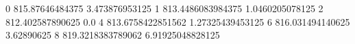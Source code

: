 0 815.87646484375 3.473876953125
1 813.4486083984375 1.0460205078125
2 812.402587890625 0.0
4 813.6758422851562 1.27325439453125
6 816.031494140625 3.62890625
8 819.3218383789062 6.91925048828125
